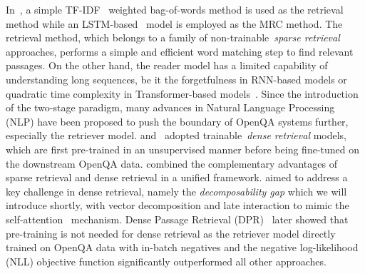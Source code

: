 %
In~\citet{chen2017reading}, a simple TF-IDF~\cite{jones1972statistical} weighted bag-of-words method is used as the retrieval method while an LSTM-based~\cite{hochreiter1997long} model is employed as the MRC method.
%
The retrieval method, which belongs to a family of non-trainable~\emph{sparse retrieval} approaches, performs a simple and efficient word matching step to find relevant passages.
%
On the other hand, the reader model has a limited capability of understanding long sequences, be it the forgetfulness in RNN-based models or quadratic time complexity in Transformer-based models~\cite{devlin2019bert}.
%
Since the introduction of the two-stage paradigm, many advances in Natural Language Processing (NLP) have been proposed to push the boundary of OpenQA systems further, especially the retriever model.
%
\citet{lee2019latent} and~\citet{guu2020realm} adopted trainable~\emph{dense retrieval} models, which are first pre-trained in an unsupervised manner before being fine-tuned on the downstream OpenQA data.
%
\citet{seo2019real} combined the complementary advantages of sparse retrieval and dense retrieval in a unified framework.
%
\citet{khattab2020colbert} aimed to address a key challenge in dense retrieval, namely the \emph{decomposability gap} which we will introduce shortly, with vector decomposition and late interaction to mimic the self-attention~\cite{vaswani2017attention} mechanism.
%
Dense Passage Retrieval (DPR)~\cite{karpukhin2020dense} later showed that pre-training is not needed for dense retrieval as the retriever model directly trained on OpenQA data with in-batch negatives and the negative log-likelihood (NLL) objective function significantly outperformed all other approaches.

